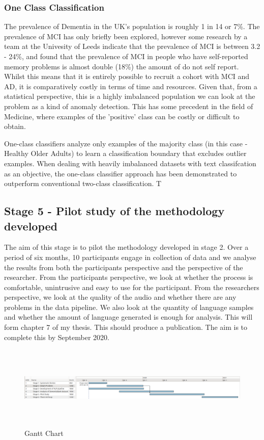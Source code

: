 \documentclass[11pt]{article}
\begin{document}
\subsubsection*{One Class Classification}
The prevalence of Dementia in the UK's population is roughly 1 in 14 or 7\%. The prevalence of MCI has only briefly been explored, however some research by a team at the Univesity of Leeds indicate that the prevalence of MCI is between 3.2 - 24\%, and found that the prevalence of MCI in people who have self-reported memory problems is almost double (18\%) the amount of do not self report. Whilst this means that it is entirely possible to recruit a cohort with MCI and AD, it is comparatively costly in terms of time and resources. Given that, from a statistical perspective, this is a highly imbalanced population we can look at the problem as a kind of anomaly detection. This has some precedent in the field of Medicine, where examples of the 'positive' class can be costly or difficult to obtain. 
\par 
One-class classifiers analyze only examples of the majority class (in this case - Healthy Older Adults) to learn a classification boundary that excludes outlier examples. When dealing with heavily imbalanced datasets with text classifcation as an objective, the one-class classifier approach has been demonstrated to outperform conventional two-class classification.  T

\subsection*{Stage 5 - Pilot study of the methodology developed}
The aim of this stage is to pilot the methodology developed in stage 2. Over a period of six months, 10 participants engage in collection of data and we analyse the results from both the participants perspective and the perspective of the researcher. From the participants perspective, we look at whether the process is comfortable, unintrusive and easy to use for the participant. From the researchers perspective, we look at the quality of the audio and whether there are any problems in the data pipeline. We also look at the quantity of language samples and whether the amount of language generated is enough for analysis. This will form chapter 7 of my thesis. This should produce a publication. The aim is to complete this by September 2020.

\begin{landscape}
\begin{figure}[H]
\centering
\includegraphics[width=650px, height=150px]{images/GanttChartUpdated.png}
\caption{Gantt Chart}
\end{figure}
\end{landscape}
\end{document}

